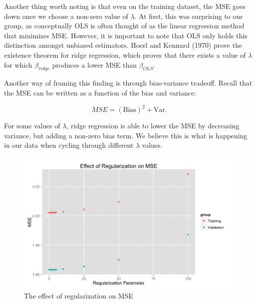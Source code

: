 \documentclass[fleqn,12pt]{SelfArx} %
\begin{document}
Another thing worth noting is that even on the training dataset, the MSE goes down once we choose a non-zero value of $\lambda$. At first, this was surprising to our group, as conceptually OLS is often thought of as the linear regression method that minimizes MSE. However, it is important to note that OLS only holds this distinction amongst unbiased estimators. Hoerl and Kennard (1970) \cite{hoerl1970ridge} prove the existence theorem for ridge regression, which proves that there exists a value of $\lambda$ for which $\beta_{ridge}$ produces a lower MSE than $\beta_{OLS}$. 

Another way of framing this finding is through bias-variance tradeoff. Recall that the MSE can be written as a function of the bias and variance:

\begin{equation}
MSE = (\textrm{Bias})^2 + \textrm{Var}.
\end{equation}

\noindent For some values of $\lambda$, ridge regression is able to lower the MSE by decreasing variance, but adding a non-zero bias term. We believe this is what is happening in our data when cycling through different $\lambda$ values.

\begin{figure}[ht]\centering
\includegraphics[width=\linewidth]{mse_plot.png}
\caption{The effect of regularization on MSE}
\label{fig:mse_plot}
\end{figure}
\end{document}
